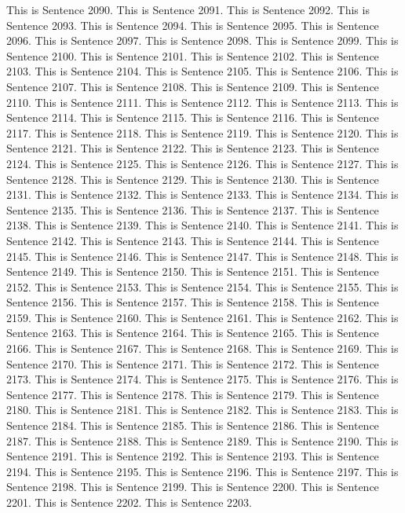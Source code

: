 \documentclass{article}
\begin{document}
This is Sentence 2090.
This is Sentence 2091.
This is Sentence 2092.
This is Sentence 2093.
This is Sentence 2094.
This is Sentence 2095.
This is Sentence 2096.
This is Sentence 2097.
This is Sentence 2098.
This is Sentence 2099.
This is Sentence 2100.
This is Sentence 2101.
This is Sentence 2102.
This is Sentence 2103.
This is Sentence 2104.
This is Sentence 2105.
This is Sentence 2106.
This is Sentence 2107.
This is Sentence 2108.
This is Sentence 2109.
This is Sentence 2110.
This is Sentence 2111.
This is Sentence 2112.
This is Sentence 2113.
This is Sentence 2114.
This is Sentence 2115.
This is Sentence 2116.
This is Sentence 2117.
This is Sentence 2118.
This is Sentence 2119.
This is Sentence 2120.
This is Sentence 2121.
This is Sentence 2122.
This is Sentence 2123.
This is Sentence 2124.
This is Sentence 2125.
This is Sentence 2126.
This is Sentence 2127.
This is Sentence 2128.
This is Sentence 2129.
This is Sentence 2130.
This is Sentence 2131.
This is Sentence 2132.
This is Sentence 2133.
This is Sentence 2134.
This is Sentence 2135.
This is Sentence 2136.
This is Sentence 2137.
This is Sentence 2138.
This is Sentence 2139.
This is Sentence 2140.
This is Sentence 2141.
This is Sentence 2142.
This is Sentence 2143.
This is Sentence 2144.
This is Sentence 2145.
This is Sentence 2146.
This is Sentence 2147.
This is Sentence 2148.
This is Sentence 2149.
This is Sentence 2150.
This is Sentence 2151.
This is Sentence 2152.
This is Sentence 2153.
This is Sentence 2154.
This is Sentence 2155.
This is Sentence 2156.
This is Sentence 2157.
This is Sentence 2158.
This is Sentence 2159.
This is Sentence 2160.
This is Sentence 2161.
This is Sentence 2162.
This is Sentence 2163.
This is Sentence 2164.
This is Sentence 2165.
This is Sentence 2166.
This is Sentence 2167.
This is Sentence 2168.
This is Sentence 2169.
This is Sentence 2170.
This is Sentence 2171.
This is Sentence 2172.
This is Sentence 2173.
This is Sentence 2174.
This is Sentence 2175.
This is Sentence 2176.
This is Sentence 2177.
This is Sentence 2178.
This is Sentence 2179.
This is Sentence 2180.
This is Sentence 2181.
This is Sentence 2182.
This is Sentence 2183.
This is Sentence 2184.
This is Sentence 2185.
This is Sentence 2186.
This is Sentence 2187.
This is Sentence 2188.
This is Sentence 2189.
This is Sentence 2190.
This is Sentence 2191.
This is Sentence 2192.
This is Sentence 2193.
This is Sentence 2194.
This is Sentence 2195.
This is Sentence 2196.
This is Sentence 2197.
This is Sentence 2198.
This is Sentence 2199.
This is Sentence 2200.
This is Sentence 2201.
This is Sentence 2202.
This is Sentence 2203.
\end{document}

